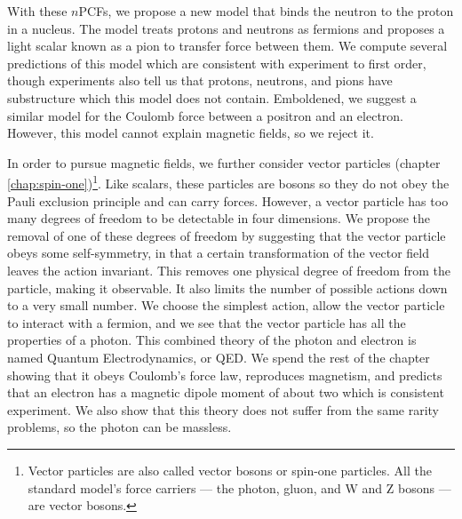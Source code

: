With these $n$PCFs, we propose a new model that binds the neutron to the proton in a nucleus. The model treats protons and neutrons as fermions and proposes a light scalar known as a pion to transfer force between them. We compute several predictions of this model which are consistent with experiment to first order, though experiments also tell us that protons, neutrons, and pions have substructure which this model does not contain. Emboldened, we suggest a similar model for the Coulomb force between a positron and an electron. However, this model cannot explain magnetic fields, so we reject it. 

In order to pursue magnetic fields, we further consider vector particles (chapter \ref{chap:spin-one})\footnote{Vector particles are also called vector bosons or spin-one particles. All the standard model's force carriers --- the photon, gluon, and W and Z bosons --- are vector bosons.}. Like scalars, these particles are bosons so they do not obey the Pauli exclusion principle and can carry forces. However, a vector particle has too many degrees of freedom to be detectable in four dimensions. We propose the removal of one of these degrees of freedom by suggesting that the vector particle obeys some self-symmetry, in that a certain transformation of the vector field leaves the action invariant. This removes one physical degree of freedom from the particle, making it observable. It also limits the number of possible actions down to a very small number. We choose the simplest action, allow the vector particle to interact with a fermion, and we see that the vector particle has all the properties of a photon. This combined theory of the photon and electron is named Quantum Electrodynamics, or QED. We spend the rest of the chapter showing that it obeys Coulomb's force law, reproduces magnetism, and predicts that an electron has a magnetic dipole moment of about two which is consistent experiment. We also show that this theory does not suffer from the same rarity problems, so the photon can be massless.

